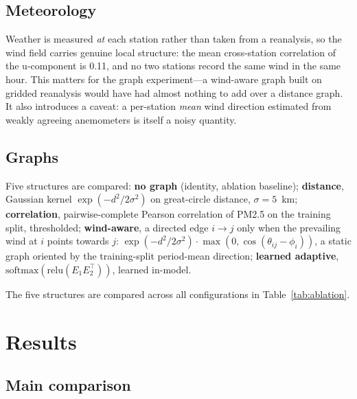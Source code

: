 \documentclass[11pt,a4paper]{article}
\begin{document}
\subsection{Meteorology}
Weather is measured \emph{at} each station rather than taken from a reanalysis,
so the wind field carries genuine local structure: the mean cross-station
correlation of the u-component is 0.11, and no two stations record the same
wind in the same hour.  This matters for the graph experiment---a wind-aware
graph built on gridded reanalysis would have had almost nothing to add over a
distance graph.  It also introduces a caveat: a per-station \emph{mean} wind
direction estimated from weakly agreeing anemometers is itself a noisy quantity.

\subsection{Graphs}
Five structures are compared: \textbf{no graph} (identity, ablation baseline);
\textbf{distance}, Gaussian kernel $\exp(-d^2/2\sigma^2)$ on great-circle
distance, $\sigma=5$~km; \textbf{correlation}, pairwise-complete Pearson
correlation of PM2.5 on the training split, thresholded;
\textbf{wind-aware}, a directed edge $i\to j$ only when the prevailing wind at
$i$ points towards $j$: $\exp(-d^2/2\sigma^2)\cdot\max(0,\cos(\theta_{ij}-\phi_i))$,
a static graph oriented by the training-split period-mean direction;
\textbf{learned adaptive}, $\mathrm{softmax}(\mathrm{relu}(E_1E_2^\top))$,
learned in-model.

The five structures are compared across all configurations in Table~\ref{tab:ablation}.

\section{Results}

\subsection{Main comparison}
\end{document}
